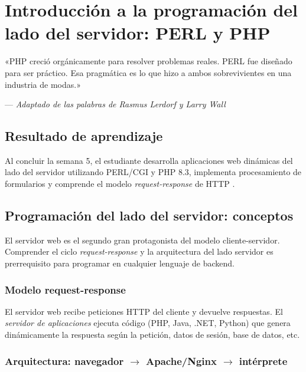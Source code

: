 \documentclass[11pt,a4paper,openany]{book}
\begin{document}

\chapter{Introducción a la programación del lado del servidor: PERL y PHP}
\label{cap:semana5}

\epigraph{«PHP creció orgánicamente para resolver problemas reales.
PERL fue diseñado para ser práctico. Esa pragmática es lo que hizo a
ambos sobrevivientes en una industria de modas.»}{--- \textit{Adaptado
de las palabras de Rasmus Lerdorf y Larry Wall}}

\section*{Resultado de aprendizaje}
Al concluir la semana 5, el estudiante desarrolla aplicaciones web
dinámicas del lado del servidor utilizando PERL/CGI y PHP 8.3,
implementa procesamiento de formularios y comprende el modelo
\emph{request-response} de HTTP \cite{nixon2021learning}.

\section{Programación del lado del servidor: conceptos}

El servidor web es el segundo gran protagonista del modelo
cliente-servidor. Comprender el ciclo \emph{request-response} y la
arquitectura del lado servidor es prerrequisito para programar en
cualquier lenguaje de backend.


\subsection{Modelo request-response}

El servidor web recibe peticiones HTTP del cliente y devuelve
respuestas. El \emph{servidor de aplicaciones} ejecuta código
(PHP, Java, .NET, Python) que genera dinámicamente la respuesta
según la petición, datos de sesión, base de datos, etc.

\subsection{Arquitectura: navegador $\to$ Apache/Nginx $\to$ intérprete}
\end{document}
